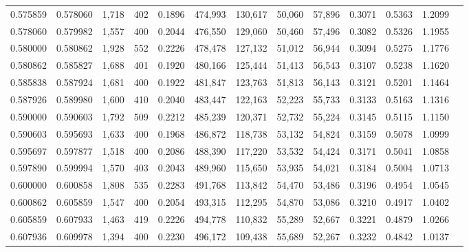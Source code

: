 \begin{tabular}{rrrrrrrrrrrrr}
0.575859 & 0.578060 &  1,718 &   402 &                                     0.1896 & 474,993 & 130,617 &  50,060 &  57,896 & 0.3071 & 0.5363 & 1.2099 \\
0.578060 & 0.579982 &  1,557 &   400 &                                     0.2044 & 476,550 & 129,060 &  50,460 &  57,496 & 0.3082 & 0.5326 & 1.1955 \\
0.580000 & 0.580862 &  1,928 &   552 &                                     0.2226 & 478,478 & 127,132 &  51,012 &  56,944 & 0.3094 & 0.5275 & 1.1776 \\
0.580862 & 0.585827 &  1,688 &   401 &                                     0.1920 & 480,166 & 125,444 &  51,413 &  56,543 & 0.3107 & 0.5238 & 1.1620 \\
0.585838 & 0.587924 &  1,681 &   400 &                                     0.1922 & 481,847 & 123,763 &  51,813 &  56,143 & 0.3121 & 0.5201 & 1.1464 \\
0.587926 & 0.589980 &  1,600 &   410 &                                     0.2040 & 483,447 & 122,163 &  52,223 &  55,733 & 0.3133 & 0.5163 & 1.1316 \\
0.590000 & 0.590603 &  1,792 &   509 &                                     0.2212 & 485,239 & 120,371 &  52,732 &  55,224 & 0.3145 & 0.5115 & 1.1150 \\
0.590603 & 0.595693 &  1,633 &   400 &                                     0.1968 & 486,872 & 118,738 &  53,132 &  54,824 & 0.3159 & 0.5078 & 1.0999 \\
0.595697 & 0.597877 &  1,518 &   400 &                                     0.2086 & 488,390 & 117,220 &  53,532 &  54,424 & 0.3171 & 0.5041 & 1.0858 \\
0.597890 & 0.599994 &  1,570 &   403 &                                     0.2043 & 489,960 & 115,650 &  53,935 &  54,021 & 0.3184 & 0.5004 & 1.0713 \\
0.600000 & 0.600858 &  1,808 &   535 &                                     0.2283 & 491,768 & 113,842 &  54,470 &  53,486 & 0.3196 & 0.4954 & 1.0545 \\
0.600862 & 0.605859 &  1,547 &   400 &                                     0.2054 & 493,315 & 112,295 &  54,870 &  53,086 & 0.3210 & 0.4917 & 1.0402 \\
0.605859 & 0.607933 &  1,463 &   419 &                                     0.2226 & 494,778 & 110,832 &  55,289 &  52,667 & 0.3221 & 0.4879 & 1.0266 \\
0.607936 & 0.609978 &  1,394 &   400 &                                     0.2230 & 496,172 & 109,438 &  55,689 &  52,267 & 0.3232 & 0.4842 & 1.0137 \\

\end{tabular}
